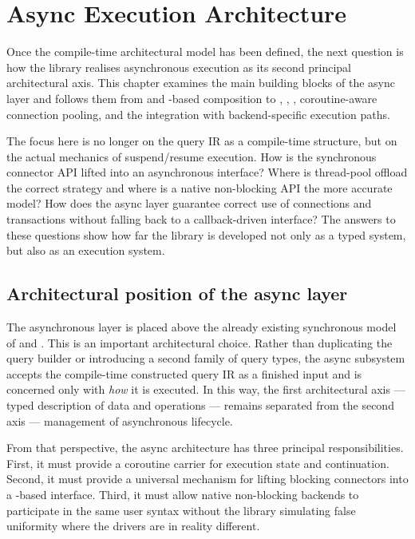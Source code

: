 \section{Async Execution Architecture}
\label{sec:async_execution_architecture}

Once the compile-time architectural model has been defined, the next question is how the library realises asynchronous execution as its second principal architectural axis. This chapter examines the main building blocks of the async layer and follows them from  and -based composition to , , , coroutine-aware connection pooling, and the integration with backend-specific execution paths.

The focus here is no longer on the query IR as a compile-time structure, but on the actual mechanics of suspend/resume execution. How is the synchronous connector API lifted into an asynchronous interface? Where is thread-pool offload the correct strategy and where is a native non-blocking API the more accurate model? How does the async layer guarantee correct use of connections and transactions without falling back to a callback-driven interface? The answers to these questions show how far the library is developed not only as a typed system, but also as an execution system.

\subsection{Architectural position of the async layer}

The asynchronous layer is placed above the already existing synchronous model of  and . This is an important architectural choice. Rather than duplicating the query builder or introducing a second family of query types, the async subsystem accepts the compile-time constructed query IR as a finished input and is concerned only with \emph{how} it is executed. In this way, the first architectural axis --- typed description of data and operations --- remains separated from the second axis --- management of asynchronous lifecycle.

From that perspective, the async architecture has three principal responsibilities. First, it must provide a coroutine carrier for execution state and continuation. Second, it must provide a universal mechanism for lifting blocking connectors into a -based interface. Third, it must allow native non-blocking backends to participate in the same user syntax without the library simulating false uniformity where the drivers are in reality different.

